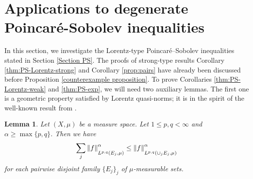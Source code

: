 \documentclass[reqno, 10pt, oneside]{amsart}
\numberwithin{equation}{section}
\newcommand{\strt}[1]{\rule{0pt}{#1}}
\newtheorem{lemma}[theorem]{Lemma}
\numberwithin{theorem}{section}
\newcommand{\1}{{\rm 1\hspace*{-0.4ex}%
\rule{0.1ex}{1.52ex}\hspace*{0.2ex}}}
\begin{document}
\section{Applications to degenerate Poincaré-Sobolev inequalities}\label{Section 5}

In this section, we investigate the Lorentz-type Poincar\'e--Sobolev inequalities stated in Section \ref{Section PS}. The proofs of strong-type results Corollary \ref{thm:PS-Lorentz-strong} and Corollary \ref{prop:pairs} have already been discussed before Proposition {\ref{counterexample proposition}}. To prove Corollaries \ref{thm:PS-Lorentz-weak} and \ref{thm:PS-exp}, we will need two auxiliary lemmas. The first one is a geometric property satisfied by Lorentz quasi-norms; it is in the spirit of the well-known result from \cite{CHK}.

\begin{lemma}\label{Lemma Lorentz}
		Let $(X,\mu)$ be a measure space. Let $1\le p,q<\infty$ and $\alpha\ge \max \{p,q\}$. Then we have		
        \begin{equation*}
			\sum_j \left\| f \right\|_{\strt{2.3ex} L^{p,q}\left(E_j , \mu\right)}^\alpha \le \left\| f \right\|_{\strt{2.3ex} L^{p,q}\left(\cup_j E_j , \mu \right)}^\alpha
		\end{equation*}
		for each pairwise disjoint family $\{E_j\}_j$ of $\mu$-measurable sets.
	\end{lemma}
	
\end{document}
